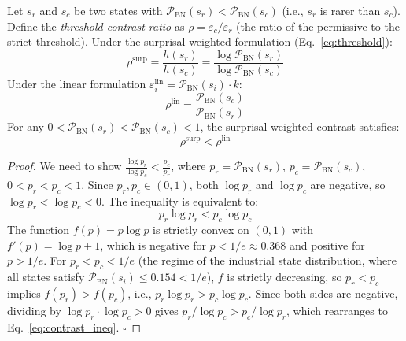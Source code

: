 \documentclass[manuscript,screen,review]{acmart}
\begin{document}
\begin{proposition}
\label{prop:surprisal_advantage}
Let $s_r$ and $s_c$ be two states with
$\mathcal{P}_{\mathrm{BN}}(s_r) < \mathcal{P}_{\mathrm{BN}}(s_c)$
(i.e., $s_r$ is rarer than $s_c$).
Define the \emph{threshold contrast ratio} as
$\rho = \varepsilon_c / \varepsilon_r$
(the ratio of the permissive to the strict threshold).
Under the surprisal-weighted formulation
(Eq.~\eqref{eq:threshold}):
\begin{equation}
\rho^{\mathrm{surp}} = \frac{h(s_r)}{h(s_c)}
= \frac{\log \mathcal{P}_{\mathrm{BN}}(s_r)}
       {\log \mathcal{P}_{\mathrm{BN}}(s_c)}
\label{eq:contrast_surp}
\end{equation}
Under the linear formulation
$\varepsilon_i^{\mathrm{lin}} = \mathcal{P}_{\mathrm{BN}}(s_i) \cdot k$:
\begin{equation}
\rho^{\mathrm{lin}} = \frac{\mathcal{P}_{\mathrm{BN}}(s_c)}
                          {\mathcal{P}_{\mathrm{BN}}(s_r)}
\label{eq:contrast_lin}
\end{equation}
For any $0 < \mathcal{P}_{\mathrm{BN}}(s_r) < \mathcal{P}_{\mathrm{BN}}(s_c) < 1$,
the surprisal-weighted contrast satisfies:
\begin{equation}
\rho^{\mathrm{surp}} < \rho^{\mathrm{lin}}
\label{eq:contrast_ineq}
\end{equation}
\end{proposition}

\begin{proof}
We need to show
$\frac{\log p_r}{\log p_c} < \frac{p_c}{p_r}$,
where $p_r = \mathcal{P}_{\mathrm{BN}}(s_r)$,
$p_c = \mathcal{P}_{\mathrm{BN}}(s_c)$,
$0 < p_r < p_c < 1$.
Since $p_r, p_c \in (0,1)$, both $\log p_r$ and $\log p_c$
are negative, so $\log p_r < \log p_c < 0$.
The inequality is equivalent to:
\begin{equation}
p_r \log p_r < p_c \log p_c
\label{eq:proof_step}
\end{equation}
The function $f(p) = p \log p$ is strictly convex on
$(0,1)$ with $f'(p) = \log p + 1$, which is negative
for $p < 1/e \approx 0.368$ and positive for $p > 1/e$.
For $p_r < p_c < 1/e$ (the regime of the industrial
state distribution, where all states satisfy
$\mathcal{P}_{\mathrm{BN}}(s_i) \leq 0.154 < 1/e$),
$f$ is strictly decreasing, so $p_r < p_c$ implies
$f(p_r) > f(p_c)$, i.e.,
$p_r \log p_r > p_c \log p_c$.
Since both sides are negative, dividing by
$\log p_r \cdot \log p_c > 0$ gives
$p_r / \log p_c > p_c / \log p_r$, which rearranges
to Eq.~\eqref{eq:contrast_ineq}. $\square$
\end{proof}
\end{document}
